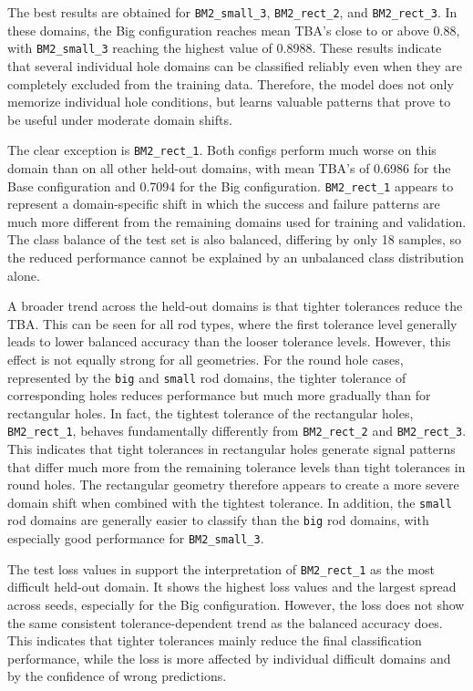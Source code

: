 The best results are obtained for \texttt{BM2\_small\_3}, \texttt{BM2\_rect\_2}, and \texttt{BM2\_rect\_3}. In these domains, the Big configuration reaches mean TBA's close to or above 0.88, with \texttt{BM2\_small\_3} reaching the highest value of 0.8988. These results indicate that several individual hole domains can be classified reliably even when they are completely excluded from the training data. Therefore, the model does not only memorize individual hole conditions, but learns valuable patterns that prove to be useful under moderate domain shifts.

The clear exception is \texttt{BM2\_rect\_1}. Both configs perform much worse on this domain than on all other held-out domains, with mean TBA's of 0.6986 for the Base configuration and 0.7094 for the Big configuration. \texttt{BM2\_rect\_1} appears to represent a domain-specific shift in which the success and failure patterns are much more different from the remaining domains used for training and validation. The class balance of the test set is also balanced, differing by only 18 samples, so the reduced performance cannot be explained by an unbalanced class distribution alone.

A broader trend across the held-out domains is that tighter tolerances reduce the TBA. This can be seen for all rod types, where the first tolerance level generally leads to lower balanced accuracy than the looser tolerance levels. However, this effect is not equally strong for all geometries. For the round hole cases, represented by the \texttt{big} and \texttt{small} rod domains, the tighter tolerance of corresponding holes reduces performance but much more gradually than for rectangular holes. In fact, the tightest tolerance of the rectangular holes, \texttt{BM2\_rect\_1}, behaves fundamentally differently from \texttt{BM2\_rect\_2} and \texttt{BM2\_rect\_3}. This indicates that tight tolerances in rectangular holes generate signal patterns that differ much more from the remaining tolerance levels than tight tolerances in round holes. The rectangular geometry therefore appears to create a more severe domain shift when combined with the tightest tolerance. In addition, the \texttt{small} rod domains are generally easier to classify than the \texttt{big} rod domains, with especially good performance for \texttt{BM2\_small\_3}.

The test loss values in  support the interpretation of \texttt{BM2\_rect\_1} as the most difficult held-out domain. It shows the highest loss values and the largest spread across seeds, especially for the Big configuration. However, the loss does not show the same consistent tolerance-dependent trend as the balanced accuracy does. This indicates that tighter tolerances mainly reduce the final classification performance, while the loss is more affected by individual difficult domains and by the confidence of wrong predictions.

